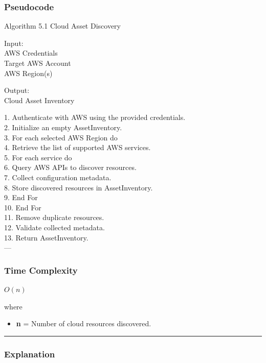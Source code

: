 \subsubsection{\texorpdfstring{\textbf{Pseudocode}}{Pseudocode}}

Algorithm 5.1 Cloud Asset Discovery

Input:\\
AWS Credentials\\
Target AWS Account\\
AWS Region(s)

Output:\\
Cloud Asset Inventory

1. Authenticate with AWS using the provided credentials.\\
2. Initialize an empty AssetInventory.\\
3. For each selected AWS Region do\\
4. Retrieve the list of supported AWS services.\\
5. For each service do\\
6. Query AWS APIs to discover resources.\\
7. Collect configuration metadata.\\
8. Store discovered resources in AssetInventory.\\
9. End For\\
10. End For\\
11. Remove duplicate resources.\\
12. Validate collected metadata.\\
13. Return AssetInventory.\\
---

\subsubsection{\texorpdfstring{\textbf{Time Complexity}}{Time Complexity}}

$O(n)$

where

\begin{itemize}
\tightlist
\item
  \textbf{n} = Number of cloud resources discovered.
\end{itemize}

\begin{center}\rule{0.5\linewidth}{0.5pt}\end{center}

\subsubsection{\texorpdfstring{\textbf{Explanation}}{Explanation}}

